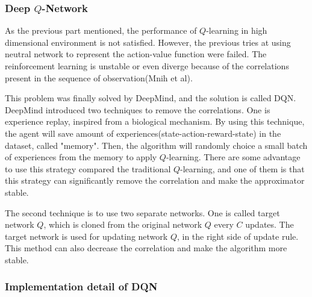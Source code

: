 \documentclass[14pt]{extarticle}
\begin{document}
\subsubsection{Deep $Q$-Network} 

As the previous part mentioned, the performance of $Q$-learning in high dimensional environment is not satisfied. However, the previous tries at using neutral network to represent the action-value function were failed. The reinforcement learning is unstable or even diverge because of the correlations present in the sequence of observation(Mnih et al). 

This problem was finally solved by DeepMind, and the solution is called DQN. DeepMind introduced two techniques to remove the correlations. One is experience replay, inspired from a biological mechanism. By using this technique, the agent will save amount of experiences(state-action-reward-state) in the dataset, called "memory". Then, the algorithm will randomly choice a small batch of experiences from the memory to apply $Q$-learning. There are some advantage to use this strategy compared the traditional $Q$-learning, and one of them is that this strategy can significantly remove the correlation and make the approximator stable.

The second technique is to use two separate networks. One is called target network $Q$, which is cloned from the original network $Q$ every $C$ updates. The target network is used for updating network $Q$, in the right side of update rule. This method can also decrease the correlation and make the algorithm more stable.

\subsubsection*{\small Implementation detail of DQN}
\end{document}
